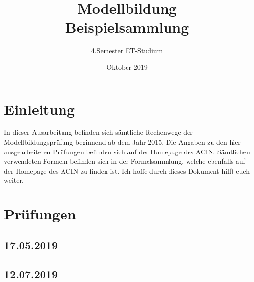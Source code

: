 \documentclass[a4paper,12p]{article}
\title{\huge Modellbildung\\\large \huge Beispielsammlung}
\author{\huge 4.Semester ET-Studium}
\date{\huge Oktober 2019}
\begin{document}
	
	\maketitle
	\newpage
	\tableofcontents
	\newpage
	
	\section{Einleitung}
	In dieser Ausarbeitung befinden sich sämtliche Rechenwege der Modellbildungsprüfung beginnend ab dem Jahr 2015. Die Angaben zu den hier ausgearbeiteten Prüfungen befinden sich auf der Homepage des ACIN. Sämtlichen verwendeten Formeln befinden sich in der Formelsammlung, welche ebenfalls auf der Homepage des ACIN zu finden ist. Ich hoffe durch dieses Dokument hilft euch weiter. 
	
	\section{Prüfungen}
	
	\subsection{17.05.2019}
	
	
	
	\subsection{12.07.2019}
	
\end{document}
